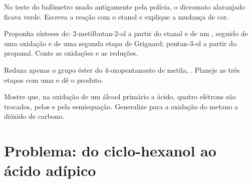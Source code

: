 \begin{exercise}[$\star\star$]\label{exo:b1:organic-redox:9}
No teste do bafômetro usado antigamente pela polícia, o dicromato
alaranjado ficava verde. Escreva a reação com o etanol e explique a
mudança de cor.
\end{exercise}

\begin{exercise}[$\star\star\star$]\label{exo:b1:organic-redox:10}
Proponha sínteses de: 2-metilbutan-2-ol a partir do etanal e de um
, seguido de uma oxidação e de uma segunda etapa de
Grignard; pentan-3-ol a partir do propanal. Conte as oxidações e as reduções.
\end{exercise}

\begin{exercise}[$\star\star\star$]\label{exo:b1:organic-redox:11}
Reduza apenas o grupo éster do 4-oxopentanoato de metila,
. Planeje as três etapas com uma  e dê o
produto.
\end{exercise}

\begin{exercise}[$\star\star\star$]\label{exo:b1:organic-redox:12}
Mostre que, na oxidação de um álcool primário a ácido, quatro elétrons
são trocados, pelos  e pela semiequação. Generalize
para a oxidação do metano a dióxido de carbono.
\end{exercise}

\section{Problema: do ciclo-hexanol ao ácido adípico}

